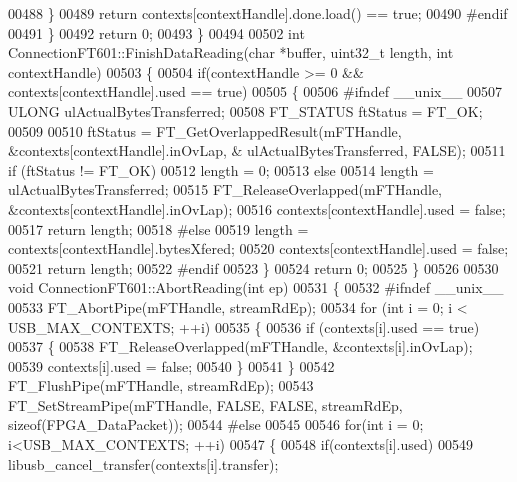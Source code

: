 \begin{DoxyCode}
{{{{00488         \}
00489         \textcolor{keywordflow}{return} contexts[contextHandle].done.load() == \textcolor{keyword}{true};
00490 \textcolor{preprocessor}{#endif}
00491     \}
00492     \textcolor{keywordflow}{return} 0;
00493 \}
00494 
00502 \textcolor{keywordtype}{int} ConnectionFT601::FinishDataReading(\textcolor{keywordtype}{char} *buffer, uint32\_t length, \textcolor{keywordtype}{int} contextHandle)
00503 \{
00504     \textcolor{keywordflow}{if}(contextHandle >= 0 && contexts[contextHandle].used == \textcolor{keyword}{true})
00505     \{
00506 \textcolor{preprocessor}{#ifndef \_\_unix\_\_}
00507     ULONG ulActualBytesTransferred;
00508         FT_STATUS ftStatus = FT_OK;
00509 
00510         ftStatus = FT\_GetOverlappedResult(mFTHandle, &contexts[contextHandle].inOvLap, &
      ulActualBytesTransferred, FALSE);
00511         \textcolor{keywordflow}{if} (ftStatus != FT_OK)
00512             length = 0;
00513         \textcolor{keywordflow}{else}
00514             length = ulActualBytesTransferred;
00515         FT\_ReleaseOverlapped(mFTHandle, &contexts[contextHandle].inOvLap);
00516         contexts[contextHandle].used = \textcolor{keyword}{false};
00517         \textcolor{keywordflow}{return} length;
00518 \textcolor{preprocessor}{#else}
00519         length = contexts[contextHandle].bytesXfered;
00520         contexts[contextHandle].used = \textcolor{keyword}{false};
00521         \textcolor{keywordflow}{return} length;
00522 \textcolor{preprocessor}{#endif}
00523     \}
00524     \textcolor{keywordflow}{return} 0;
00525 \}
00526 
00530 \textcolor{keywordtype}{void} ConnectionFT601::AbortReading(\textcolor{keywordtype}{int} ep)
00531 \{
00532 \textcolor{preprocessor}{#ifndef \_\_unix\_\_}
00533     FT\_AbortPipe(mFTHandle, streamRdEp);
00534     \textcolor{keywordflow}{for} (\textcolor{keywordtype}{int} i = 0; i < USB\_MAX\_CONTEXTS; ++i)
00535     \{
00536         \textcolor{keywordflow}{if} (contexts[i].used == \textcolor{keyword}{true})
00537         \{
00538             FT\_ReleaseOverlapped(mFTHandle, &contexts[i].inOvLap);
00539             contexts[i].used = \textcolor{keyword}{false};
00540         \}
00541     \}
00542     FT\_FlushPipe(mFTHandle, streamRdEp);
00543     FT\_SetStreamPipe(mFTHandle, FALSE, FALSE, streamRdEp, \textcolor{keyword}{sizeof}(FPGA_DataPacket));
00544 \textcolor{preprocessor}{#else}
00545 
00546     \textcolor{keywordflow}{for}(\textcolor{keywordtype}{int} i = 0; i<USB\_MAX\_CONTEXTS; ++i)
00547     \{
00548         \textcolor{keywordflow}{if}(contexts[i].used)
00549             libusb\_cancel\_transfer(contexts[i].transfer);
}}}}
\end{DoxyCode}
